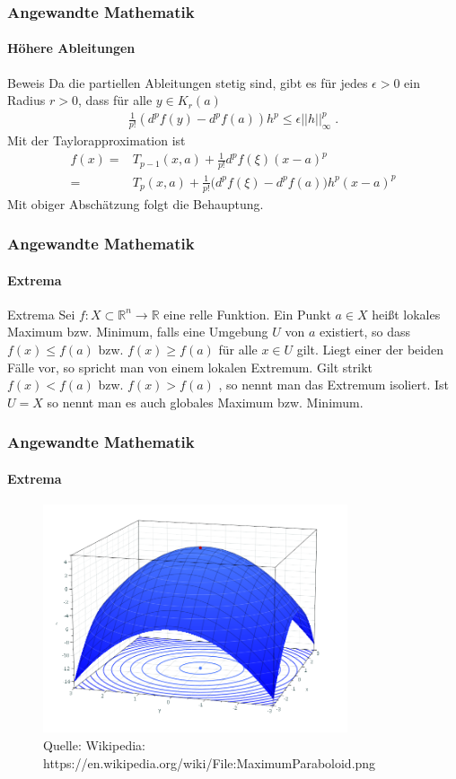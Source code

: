 \documentclass{beamer}
\begin{document}
\begin{frame}
    \frametitle{Angewandte Mathematik}
\framesubtitle{Höhere Ableitungen}
    \begin{block}{Beweis}
Da die partiellen Ableitungen stetig sind, gibt es für jedes $\epsilon > 0$ ein Radius $r >0$, dass für alle $y \in K_r(a)$
\begin{align*}
\frac{1}{p!} (d^pf(y) -d^pf(a))h^p \leq \epsilon ||h||_{\infty}^p \; . 
\end{align*}
Mit der Taylorapproximation ist 
\begin{align*}
f(x) = & T_{p-1}(x, a) +  \frac{1}{p!} d^{p}f(\xi) (x-a)^{p} \\
 = & T_p(x,a) +   \frac{1}{p!} \bigl( d^pf(\xi) -d^pf(a) \bigr) h^p (x-a)^p
\end{align*} 
Mit obiger Abschätzung folgt die Behauptung.
\end{block}
 \end{frame}


\begin{frame}
    \frametitle{Angewandte Mathematik}
\framesubtitle{Extrema}
    \begin{block}{Extrema}
Sei $f : X \subset \mathbb{R}^n \to \mathbb{R}$ eine relle Funktion.  Ein Punkt $a \in  X$ heißt lokales Maximum bzw. Minimum, falls eine Umgebung $U$ von $a$ existiert, so dass $f(x) \leq f(a)$ bzw.  $f(x) \geq f(a)$ für alle $x \in U$ gilt. Liegt einer der beiden Fälle vor, so spricht man von einem lokalen Extremum. Gilt strikt $f(x) <  f(a)$ bzw.  $f(x) > f(a)$ , so nennt man das Extremum isoliert. Ist $U = X$ so nennt man es auch globales Maximum bzw. Minimum.
\end{block}
 \end{frame}


\begin{frame}
    \frametitle{Angewandte Mathematik}
\framesubtitle{Extrema}

\begin{figure}[H]
      \centering
    \includegraphics[width=0.8\textwidth]{images/MaximumParaboloid}
      \caption{Quelle: Wikipedia: https://en.wikipedia.org/wiki/File:MaximumParaboloid.png}
   \end{figure}
 \end{frame}
\end{document}
